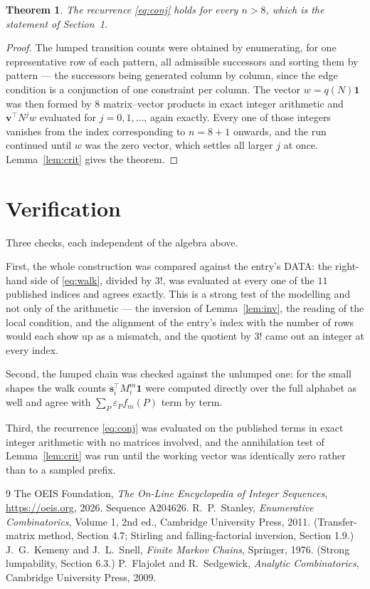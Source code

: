 \documentclass[11pt,a4paper]{article}
\theoremstyle{plain}
\newtheorem{theorem}{Theorem}
\theoremstyle{definition}
\begin{document}
\begin{theorem}
The recurrence \eqref{eq:conj} holds for every $n>8$, which is the statement of
Section~1.
\end{theorem}

\begin{proof}
The lumped transition counts were obtained by enumerating, for one representative row of
each pattern, all admissible successors and sorting them by pattern --- the successors being
generated column by column, since the edge condition is a conjunction of one constraint per
column. The vector $w=q(N)\mathbf{1}$ was then formed by $8$ matrix--vector products
in exact integer arithmetic and $\mathbf{v}^{\!\top}N^{j}w$ evaluated for
$j=0,1,\dots$, again exactly. Every one of those integers vanishes from the index
corresponding to $n=8+1$ onwards, and the run continued until $w$ was the zero vector,
which settles all larger $j$ at once. Lemma~\ref{lem:crit} gives the theorem.
\end{proof}

\section{Verification}

Three checks, each independent of the algebra above.

First, the whole construction was compared against the entry's DATA: the right-hand side of
\eqref{eq:walk}, divided by $3!$, was evaluated at every one of the $11$
published indices and agrees exactly. This is a strong test of the modelling and not only of
the arithmetic --- the inversion of Lemma~\ref{lem:inv}, the reading of the local
condition, and the alignment of the entry's index with the number of rows would each
show up as a mismatch, and the quotient by $3!$ came out an integer at every index.

Second, the lumped chain was checked against the unlumped one: for the small shapes the walk
counts $\mathbf{s}_i^{\!\top}M_i^{m}\mathbf{1}$ were computed directly over the full
alphabet as well and agree with $\sum_P\varepsilon_Pf_m(P)$ term by term.

Third, the recurrence \eqref{eq:conj} was evaluated on the published terms in exact integer
arithmetic with no matrices involved, and the annihilation test of Lemma~\ref{lem:crit} was
run until the working vector was identically zero rather than to a sampled prefix.

\begin{thebibliography}{9}
 The OEIS Foundation, \emph{The On-Line Encyclopedia of Integer
Sequences}, \url{https://oeis.org}, 2026. Sequence A204626.
 R.~P.~Stanley, \emph{Enumerative Combinatorics}, Volume 1, 2nd ed.,
Cambridge University Press, 2011. (Transfer-matrix method, Section 4.7; Stirling and
falling-factorial inversion, Section 1.9.)
 J.~G.~Kemeny and J.~L.~Snell, \emph{Finite Markov Chains}, Springer,
1976. (Strong lumpability, Section 6.3.)
 P.~Flajolet and R.~Sedgewick, \emph{Analytic Combinatorics}, Cambridge
University Press, 2009.
\end{thebibliography}
\end{document}
